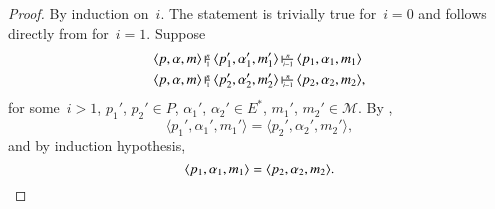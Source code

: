 \documentclass[10pt,a4paper,oneside,leqno]{article}
\makeatletter
\numberwithin{equation}{section}
\def\<#1>{\langle#1\rangle}
\def\M{\mathcal{M}}
\def\@inner#1#2{%
  \setbox0=\hbox{$\vdash$}%
  \setbox1=\hbox{$\scriptscriptstyle#1$}%
  \setbox2=\hbox{$\scriptscriptstyle#2$}%
  \ifdim\wd1>\wd2
    \setbox2=\hbox to\wd1{\hfil$\scriptscriptstyle#2$\hfil}%
  \else
    \setbox1=\hbox to\wd2{\hfil$\scriptscriptstyle#1$\hfil}%
  \fi
  \setbox3=\hbox{$\null^{\box1}_{\box2}$}%
  \dimen0=.6ex
  \ifdim\wd3>\dimen0
    \dimen0=\wd3
  \fi
  \rlap{\hbox{$\vrule height\the\ht0 depth\the\dp0 width.6pt
      \vcenter{\hrule height.3pt depth.3pt width\dimen0}$}}%
  \kern1pt\box3
}
\newcommand{\inner}[2][]{\mathbin{\@inner{#2}{#1}}}
\makeatother
\begin{document}

\thmseminneridet*
\begin{proof}\label{proof:thm:sem:inneri:det}
  By induction on~$i$.  The statement is trivially true for~$i=0$ and
  follows directly from  for~$i=1$.  Suppose
  \begin{align*}
    \label{lem:sem:innerx:det:1}
    \<p,\alpha,m>
    &\inner[1]{n}\<p_1',\alpha_1',m_1'>
    \inner[i-1]{n}\<p_1,\alpha_1,m_1>\\
    \<p,\alpha,m>
    &\inner[1]{n}\<p_2',\alpha_2',m_2'>
    \inner[i-1]{n}\<p_2,\alpha_2,m_2>,
  \end{align*}
  for some~$i>1$, $p_1'$, $p_2'\in{P}$, $\alpha_1'$, $\alpha_2'\in{E^\ast}$,
  $m_1'$, $m_2'\in\M$.  By ,
  \[
    \<p_1',\alpha_1',m_1'>=\<p_2',\alpha_2',m_2'>,
  \]
  and by induction hypothesis,
  \[
    \<p_1,\alpha_1,m_1>=\<p_2,\alpha_2,m_2>.\qedhere
  \]
\end{proof}
\end{document}
